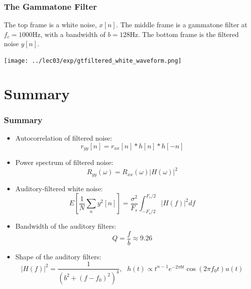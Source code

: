\documentclass{beamer}
\begin{document}
\begin{frame}
  \frametitle{The Gammatone Filter}

  The top frame is a white noise, $x[n]$.  The middle frame is a
  gammatone filter at $f_c=1000$Hz, with a bandwidth of $b=128$Hz.
  The bottom frame is the filtered noise $y[n]$.

  \centerline{\texttt{[image: ../lec03/exp/gtfiltered\_white\_waveform.png]}}
\end{frame}
  
\section[Summary]{Summary}
\setcounter{subsection}{1}

\begin{frame}
  \frametitle{Summary}
  \begin{itemize}
  \item Autocorrelation of filtered noise:
    \[
    r_{yy}[n] = r_{xx}[n]\ast h[n]\ast h[-n]
    \]
  \item Power spectrum of filtered noise:
    \[
    R_{yy}(\omega) = R_{xx}(\omega) |H(\omega)|^2
    \]
  \item Auditory-filtered white noise:
    \[
    E\left[\frac{1}{N}\sum_n y^2[n]\right] = \frac{\sigma^2}{F_s}\int_{-F_s/2}^{F_s/2} |H(f)|^2 df
    \]
  \item Bandwidth of the auditory filters:
    \[
    Q = \frac{f}{b} \approx 9.26
    \]
  \item Shape of the auditory filters:
    \[
    |H(f)|^2 = \frac{1}{(b^2+(f-f_0)^2)^4},~~~
    h(t) \propto t^{n-1} e^{-2\pi bt}\cos(2\pi f_0 t)u(t)
    \]
  \end{itemize}
\end{frame}
\end{document}
